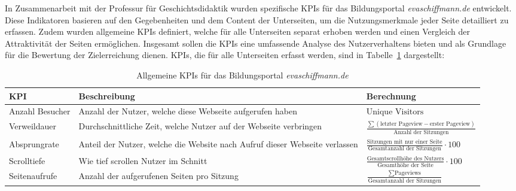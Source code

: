In Zusammenarbeit mit der Professur für Geschichtsdidaktik wurden spezifische KPIs für das Bildungsportal \textit{evaschiffmann.de} entwickelt. Diese Indikatoren basieren auf den Gegebenheiten und dem Content der Unterseiten, um die Nutzungsmerkmale jeder Seite detailliert zu erfassen. Zudem wurden allgemeine KPIs definiert, welche für alle Unterseiten separat erhoben werden und einen Vergleich der Attraktivität der Seiten ermöglichen. Insgesamt sollen die KPIs eine umfassende Analyse des Nutzerverhaltens bieten und als Grundlage für die Bewertung der Zielerreichung dienen. KPIs, die für alle Unterseiten erfasst werden, sind in Tabelle~\ref{tab:kpi_allgemein} dargestellt:

\begin{table}[h]
    \centering
    \caption{Allgemeine KPIs für das Bildungsportal \textit{evaschiffmann.de}}
    \label{tab:kpi_allgemein}
    \renewcommand{\arraystretch}{1.5} %
    \begin{tabularx}{\textwidth}{|X|X|X|}  
        \hline
        \textbf{KPI} & \textbf{Beschreibung} & \textbf{Berechnung} \\ \hline
        Anzahl Besucher & Anzahl der Nutzer, welche diese Webseite aufgerufen haben & {\footnotesize \(\text{Unique Visitors}\)} \\ \hline
        Verweildauer & Durchschnittliche Zeit, welche Nutzer auf der Webseite verbringen & 
        {\footnotesize \(\frac{\sum (\text{letzter Pageview} - \text{erster Pageview})}{\text{Anzahl der Sitzungen}}\)} \\ \hline
        Absprungrate & Anteil der Nutzer, welche die Website nach Aufruf dieser Webseite verlassen & 
        {\footnotesize \(\frac{\text{Sitzungen mit nur einer Seite}}{\text{Gesamtanzahl der Sitzungen}} \cdot 100\)} \\ \hline
        Scrolltiefe & Wie tief scrollen Nutzer im Schnitt & 
        {\footnotesize \(\frac{\text{Gesamtscrollhöhe des Nutzers}}{\text{Gesamthöhe der Seite}} \cdot 100\)} \\ \hline
        Seitenaufrufe & Anzahl der aufgerufenen Seiten pro Sitzung & 
        {\footnotesize \(\frac{\sum \text{Pageviews}}{\text{Gesamtanzahl der Sitzungen}}\)} \\ \hline
    \end{tabularx}
\end{table}

